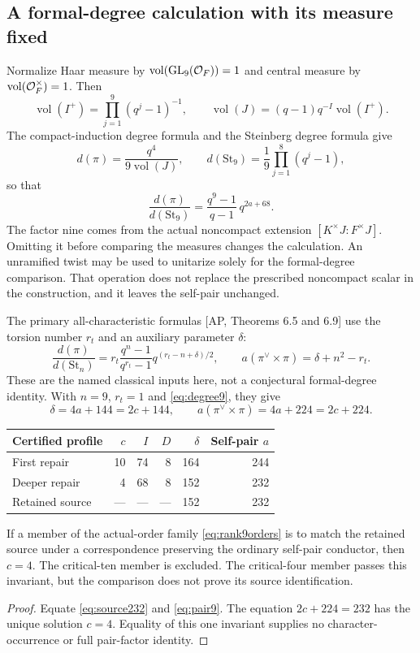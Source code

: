 \subsection{A formal-degree calculation with its measure fixed}
Normalize Haar measure by $\operatorname{vol}(\operatorname{GL}_9(\mathcal O_F))=1$ and central measure by $\operatorname{vol}(\mathcal O_F^\times)=1$. Then
\[
 \operatorname{vol}(I^+)=\prod_{j=1}^{9}(q^j-1)^{-1},
 \qquad
 \operatorname{vol}(J)=(q-1)q^{-I}\operatorname{vol}(I^+).
\]
The compact-induction degree formula and the Steinberg degree formula give
\[
 d(\pi)=\frac{q^4}{9\operatorname{vol}(J)},
 \qquad
 d(\mathrm{St}_9)=\frac1{9}\prod_{j=1}^{8}(q^j-1),
\]
so that
\[
 \frac{d(\pi)}{d(\mathrm{St}_9)}
 =\frac{q^9-1}{q-1}\,q^{2a+68}.
 \tag{23.5}\label{eq:degree9}
\]
The factor nine comes from the actual noncompact extension $[K^\times J:F^\times J]$. Omitting it before comparing the measures changes the calculation. An unramified twist may be used to unitarize solely for the formal-degree comparison. That operation does not replace the prescribed noncompact scalar in the construction, and it leaves the self-pair unchanged.

The primary all-characteristic formulas [AP, Theorems 6.5 and 6.9] use the torsion number $r_t$ and an auxiliary parameter $\delta$:
\[
 \frac{d(\pi)}{d(\mathrm{St}_n)}
 =r_t\frac{q^n-1}{q^{r_t}-1}
 q^{(r_t-n+\delta)/2},
 \qquad
 a(\pi^\vee\times\pi)=\delta+n^2-r_t.
 \tag{23.6}\label{eq:AP}
\]
These are the named classical inputs here, not a conjectural formal-degree identity. With $n=9$, $r_t=1$ and \eqref{eq:degree9}, they give
\[
 \delta=4a+144=2c+144,
 \qquad a(\pi^\vee\times\pi)=4a+224=2c+224.
 \tag{23.7}\label{eq:pair9}
\]

\begin{center}\begin{tabular}{lrrrrr}\toprule
Certified profile & $c$ & $I$ & $D$ & $\delta$ & Self-pair $a$\\\midrule
First repair & 10 & 74 & 8 & 164 & 244\\
Deeper repair & 4 & 68 & 8 & 152 & 232\\
Retained source & --- & --- & --- & 152 & 232\\\bottomrule
\end{tabular}\end{center}

\begin{corollary}\label{cor:c4}
If a member of the actual-order family \eqref{eq:rank9orders} is to match the retained source under a correspondence preserving the ordinary self-pair conductor, then $c=4$. The critical-ten member is excluded. The critical-four member passes this invariant, but the comparison does not prove its source identification.
\end{corollary}
\begin{proof}
Equate \eqref{eq:source232} and \eqref{eq:pair9}. The equation $2c+224=232$ has the unique solution $c=4$. Equality of this one invariant supplies no character-occurrence or full pair-factor identity.
\end{proof}

